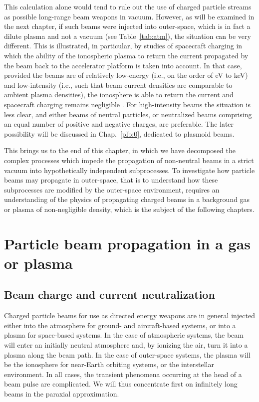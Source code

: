 \documentclass [12pt,a4paper,     ]{report} %
\begin{document}
   This calculation alone would tend to rule out the use of charged particle streams as possible long-range beam weapons in vacuum.  However, as will be examined in the next chapter, if such beams were injected into outer-space, which is in fact a dilute plasma and not a vacuum (see Table~\ref{tab:atm}), the situation can be very different. This is illustrated, in particular, by studies of spacecraft charging in which the ability of the ionospheric plasma to return the current propagated by the beam back to the accelerator platform is taken into account.  In that case, provided the beams are of relatively low-energy (i.e., on the order of eV to keV) and low-intensity (i.e., such that beam current densities are comparable to ambient plasma densities), the ionosphere is able to return the current and spacecraft charging remains negligible \cite{OKUDA1987-}.  For high-intensity beams the situation is less clear, and either beams of neutral particles, or neutralized beams comprising an equal number of positive and negative charges, are preferable.  The later possibility will be discussed in Chap.~\ref{plb:0}, dedicated to plasmoid beams.

  This brings us to the end of this chapter, in which we have decomposed the complex processes which impede the propagation of non-neutral beams in a strict vacuum into hypothetically independent subprocesses.  To investigate how particle beams may propagate in outer-space, that is to understand how these subprocesses are modified by the outer-space environment, requires an understanding of the physics of propagating charged beams in a background gas or plasma of non-negligible density, which is the subject of the following chapters.





\chapter{Particle beam propagation in a gas or plasma}

\section{Beam charge and current neutralization}
\label{bcn:0}


Charged particle beams for use as directed energy weapons are in general injected either into the atmosphere for ground-  and aircraft-based systems, or into a plasma for space-based systems.  In the case of atmospheric systems, the beam will enter an initially neutral atmosphere and, by ionizing the air, turn it into a plasma along the beam path.  In the case of outer-space systems, the plasma will be the ionosphere for near-Earth orbiting systems, or the interstellar environment.  In all cases, the transient phenomena occurring at the head of a beam pulse are complicated.  We will thus concentrate first on infinitely long beams in the paraxial approximation.
\end{document}
